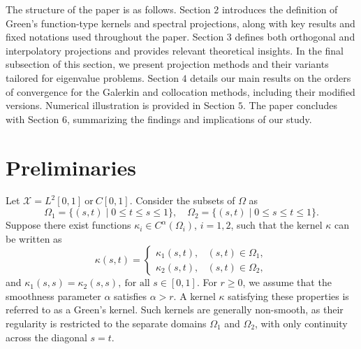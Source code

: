 \documentclass[pdflatex, sn-mathphys-num]{sn-jnl}%
\theoremstyle{thmstyleone}%
\theoremstyle{thmstyletwo}%
\theoremstyle{thmstylethree}%
\begin{document}
The structure of the paper is as follows.  Section \(2\) introduces the definition of Green's function-type kernels and spectral projections, along with key results and fixed notations used throughout the paper. Section \(3\) defines both orthogonal and interpolatory projections and provides relevant theoretical insights. In the final subsection of this section, we present projection methods and their variants tailored for eigenvalue problems. Section \(4\) details our main results on the orders of convergence for the Galerkin and collocation methods, including their modified versions. Numerical illustration is provided in Section \(5\). The paper concludes with Section \(6\), summarizing the findings and implications of our study.


\section{Preliminaries}

Let $\mathcal{X} = L^2[0,1] ~\text{or}~ C[0, 1]$. Consider the subsets  of $\Omega$ as
\[
\Omega_1 = \{(s,t) \mid 0 \leq t \leq s \leq 1\},  
\quad  
\Omega_2 = \{(s,t) \mid 0 \leq s \leq t \leq 1\}.
\]  
Suppose there exist functions \(\kappa_i \in C^{\alpha}(\Omega_i)\), \(i=1,2\), such that the kernel \(\kappa\) can be written as  
\[
\kappa(s,t) =  
\begin{cases}  
	\kappa_1(s,t), & (s,t) \in \Omega_1, \\[1mm]
	\kappa_2(s,t), & (s,t) \in \Omega_2,  
\end{cases}  
\]  
and \(
\kappa_1(s,s) = \kappa_2(s,s), ~ \text{for all } s \in [0,1].
\)
For \( r \geq 0 \), we assume that the smoothness parameter \(\alpha\) satisfies \(\alpha > r\). A kernel \(\kappa\) satisfying these properties is referred to as a Green's kernel. Such kernels are generally non-smooth, as their regularity is restricted to the separate domains \(\Omega_1\) and \(\Omega_2\), with only continuity across the diagonal $s=t$.
\end{document}

